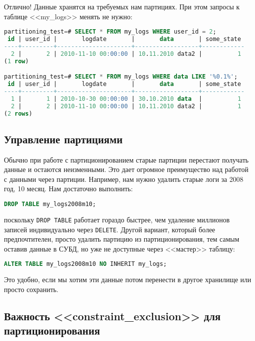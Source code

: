 Отлично! Данные хранятся на требуемых нам партициях. При этом запросы к таблице <<my\_logs>> менять не нужно:

\begin{lstlisting}[language=SQL,label=lst:partitioning11,caption=Проверка запросов]
partitioning_test=# SELECT * FROM my_logs WHERE user_id = 2;
 id | user_id |       logdate       |       data       | some_state
----+---------+---------------------+------------------+------------
  2 |       2 | 2010-11-10 00:00:00 | 10.11.2010 data2 |          1
(1 row)

partitioning_test=# SELECT * FROM my_logs WHERE data LIKE '%0.1%';
 id | user_id |       logdate       |       data       | some_state
----+---------+---------------------+------------------+------------
  1 |       1 | 2010-10-30 00:00:00 | 30.10.2010 data  |          1
  2 |       2 | 2010-11-10 00:00:00 | 10.11.2010 data2 |          1
(2 rows)
\end{lstlisting}

\subsection{Управление партициями}

Обычно при работе с партиционированием старые партиции перестают получать данные и остаются неизменными. Это дает огромное преимущество над работой с данными через партиции. Например, нам нужно удалить старые логи за 2008 год, 10 месяц. Нам достаточно выполнить:

\begin{lstlisting}[language=SQL,label=lst:partitioning12,caption=Чистка логов]
DROP TABLE my_logs2008m10;
\end{lstlisting}

поскольку \lstinline!DROP TABLE! работает гораздо быстрее, чем удаление миллионов записей индивидуально через \lstinline!DELETE!. Другой вариант, который более предпочтителен, просто удалить партицию из партиционирования, тем самым оставив данные в СУБД, но уже не доступные через <<мастер>> таблицу:

\begin{lstlisting}[language=SQL,label=lst:partitioning13,caption=Удаляем партицию из партиционирования]
ALTER TABLE my_logs2008m10 NO INHERIT my_logs;
\end{lstlisting}

Это удобно, если мы хотим эти данные потом перенести в другое хранилище или просто сохранить.

\subsection{Важность <<constraint\_exclusion>> для партиционирования}

